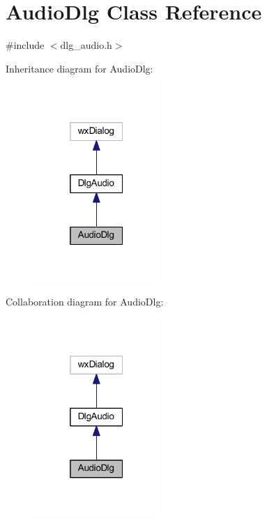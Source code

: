 \hypertarget{class_audio_dlg}{\section{Audio\-Dlg Class Reference}
\label{class_audio_dlg}
}


{\ttfamily \#include $<$dlg\-\_\-audio.\-h$>$}



Inheritance diagram for Audio\-Dlg\-:\nopagebreak
\begin{figure}[H]
\begin{center}
\leavevmode
\includegraphics[width=136pt]{class_audio_dlg__inherit__graph}
\end{center}
\end{figure}


Collaboration diagram for Audio\-Dlg\-:\nopagebreak
\begin{figure}[H]
\begin{center}
\leavevmode
\includegraphics[width=136pt]{class_audio_dlg__coll__graph}
\end{center}
\end{figure}
